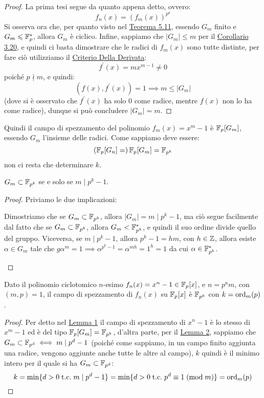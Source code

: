 \documentclass[11pt]{scrartcl}
\begin{document}
\begin{proof}
	La prima tesi segue da quanto appena detto, ovvero:
		\[ f_n(x) = (f_m(x))^{p^a}
			\]
	Si osserva ora che, per quanto visto nel \hyperref[cf:5.11]{Teorema 5.11}, essendo $G_m$ finito e $G_m \leqslant {\mathbb F}_p^*$, allora $G_m$ è ciclico.
	Infine, sappiamo che $|G_m| \leq m$ per il \hyperref[p:3.20]{Corollario 3.20}, e quindi ci basta dimostrare che le radici di $f_m(x)$ sono tutte distinte,
	per fare ciò utilizziamo il \hyperref[p:der]{Criterio Della Derivata}:
		\[ f^{\prime}(x) = mx^{m-1} \ne 0
			\]
	poiché $p \nmid m$, e quindi:
		\[ (f(x),f^{\prime}(x)) = 1 \implies m \leq |G_m|
			\]
	(dove si è osservato che $f^{\prime}(x)$ ha solo 0 come radice, mentre $f(x)$ non lo ha come radice), dunque si può concludere $|G_m| = m$.
\end{proof}

Quindi il campo di spezzamento del polinomio $f_m(x)=x^m-1$ è ${\mathbb F}_p[G_m]$, essendo $G_m$ l'insieme delle radici. Come sappiamo deve essere:
\[ ({\mathbb F}_p[G_n]=)\,{\mathbb F}_p[G_m] = \mathbb{F}_{{p}^{k}}
	\]
non ci resta che determinare $k$.

\begin{lemma}
	\label{cf:lemma2}
	$G_m \subset \mathbb{F}_{{p}^{k}}$ se e solo se $m \mid p^k-1$.
\end{lemma}

\begin{proof}
	Priviamo le due implicazioni:
		\begin{itemize}
			\ii Dimostriamo che se $G_m \subset \mathbb{F}_{{p}^{k}}$, allora $|G_m|=m\mid p^k-1$, ma 
			ciò segue facilmente dal fatto che se $G_m \subset \mathbb{F}_{{p}^{k}}$, allora $G_m < \mathbb{F}_{{p}^{k}}^*$, e quindi il suo ordine divide quello del gruppo.
			\ii Viceversa, se $m \mid p^k-1$, allora $p^k-1=hm$, con $h \in \mathbb Z$, allora esiste $\alpha \in G_m$ tale che
			$g\alpha^m = 1 \implies \alpha^{p^k-1} = \alpha^{mh} = 1^h = 1$ da cui $\alpha \in \mathbb{F}_{{p}^{k}}^*$.
		\end{itemize}
\end{proof}

\begin{theorem}
	Dato il polinomio ciclotomico $n$-esimo $f_n(x)=x^n-1 \in {\mathbb F}_p[x]$, e $n=p^am$, con $(m,p)=1$,
	il campo di spezzamento di $f_n(x)$ su ${\mathbb F}_p[x]$ è $\mathbb{F}_{{p}^{k}}$ con $k=\operatorname{ord}_{m}(p)$.
\end{theorem}

\begin{proof}
	Per detto nel \hyperref[cf:lemma1]{Lemma 1} il campo di spezzamento di $x^n-1$ è lo stesso di $x^m-1$ ed è del tipo ${\mathbb F}_p[G_m] = \mathbb{F}_{{p}^{k}}$,
	d'altra parte, per il \hyperref[cf:lemma2]{Lemma 2}, sappiamo che $G_m \subset\mathbb{F}_{{p}^{d}} \iff m\mid p^d-1$ (poiché come sappiamo, in un campo finito 
	aggiunta una radice, vengono aggiunte anche tutte le altre al campo), $k$ quindi è il minimo intero per il quale si ha $G_m \subset \mathbb{F}_{{p}^{d}}$:
		\[k=\min\{d>0 \; \text{t.c.} \; m \mid p^d - 1\} = \min \{d>0 \; \text{t.c.}\; p^d \equiv 1 \;(\text{mod} \; m)\} = \operatorname{ord}_{m}(p)
			\]
\end{proof}
\end{document}
